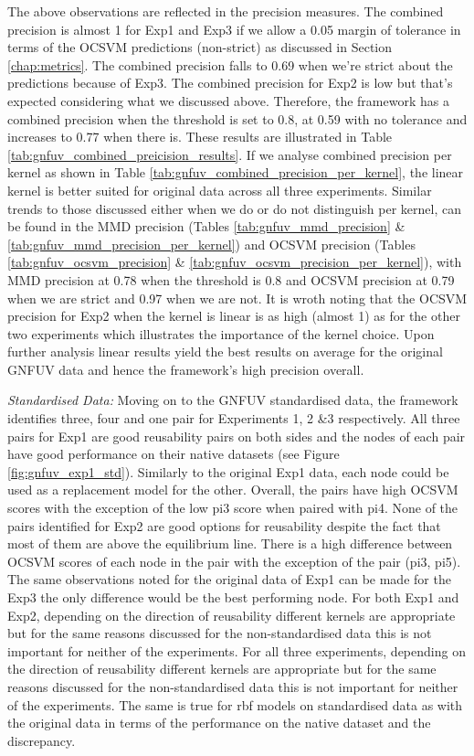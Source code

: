 \documentclass{mpaper}
\begin{document}
The above observations are reflected in the precision measures. The combined precision is almost 1 for Exp1 and Exp3 if we allow a 0.05 margin of tolerance in terms of the OCSVM predictions (non-strict) as discussed in Section \ref{chap:metrics}. The combined precision falls to 0.69 when we're strict about the predictions because of Exp3. The combined precision for Exp2 is low but that's expected considering what we discussed above. Therefore, the framework has a combined precision when the threshold is set to 0.8, at 0.59 with no tolerance and increases to 0.77 when there is. These results are illustrated in Table \ref{tab:gnfuv_combined_preicision_results}. If we analyse combined precision per kernel as shown in Table \ref{tab:gnfuv_combined_precision_per_kernel}, the linear kernel is better suited for original data across all three experiments. Similar trends to those discussed either when we do or do not distinguish per kernel, can be found in the MMD precision (Tables \ref{tab:gnfuv_mmd_precision} \& \ref{tab:gnfuv_mmd_precision_per_kernel}) and OCSVM precision (Tables \ref{tab:gnfuv_ocsvm_precision} \& \ref{tab:gnfuv_ocsvm_precision_per_kernel}), with MMD precision at 0.78 when the threshold is 0.8 and OCSVM precision at 0.79 when we are strict and 0.97 when we are not. It is wroth noting that the OCSVM precision for Exp2 when the kernel is linear is as high (almost 1) as for the other two experiments which illustrates the importance of the kernel choice. Upon further analysis linear results yield the best results on average for the original GNFUV data and hence the framework's high precision overall.

\textit{Standardised Data:} {} Moving on to the GNFUV standardised data, the framework identifies three, four and one pair for Experiments 1, 2 \&3 respectively. All three pairs for Exp1 are good reusability pairs on both sides and the nodes of each pair have good performance on their native datasets (see Figure \ref{fig:gnfuv_exp1_std}). Similarly to the original Exp1 data, each node could be used as a replacement model for the other. Overall, the pairs have high OCSVM scores with the exception of the low pi3 score when paired with pi4. None of the pairs identified for Exp2 are good options for reusability despite the fact that most of them are above the equilibrium line. There is a high difference between OCSVM scores of each node in the pair with the exception of the pair (pi3, pi5). The same observations noted for the original data of Exp1 can be made for the Exp3 the only difference would be the best performing node. For both Exp1 and Exp2, depending on the direction of reusability different kernels are appropriate but for the same reasons discussed for the non-standardised data this is not important for neither of the experiments. For all three experiments, depending on the direction of reusability different kernels are appropriate but for the same reasons discussed for the non-standardised data this is not important for neither of the experiments. The same is true for rbf models on standardised data as with the original data in terms of the performance on the native dataset and the discrepancy.
\end{document}
